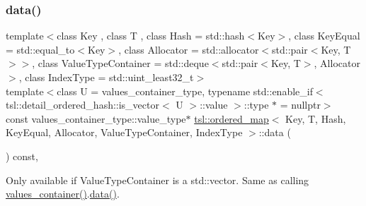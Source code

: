 \subsubsection{\texorpdfstring{data()}{data()}}
{\footnotesize\ttfamily template$<$class Key , class T , class Hash  = std\+::hash$<$\+Key$>$, class Key\+Equal  = std\+::equal\+\_\+to$<$\+Key$>$, class Allocator  = std\+::allocator$<$std\+::pair$<$\+Key, T$>$$>$, class Value\+Type\+Container  = std\+::deque$<$std\+::pair$<$\+Key, T$>$, Allocator$>$, class Index\+Type  = std\+::uint\+\_\+least32\+\_\+t$>$ \\
template$<$class U  = values\+\_\+container\+\_\+type, typename std\+::enable\+\_\+if$<$ tsl\+::detail\+\_\+ordered\+\_\+hash\+::is\+\_\+vector$<$ U $>$\+::value $>$\+::type $\ast$  = nullptr$>$ \\
const values\+\_\+container\+\_\+type\+::value\+\_\+type$\ast$ \mbox{\hyperlink{classtsl_1_1ordered__map}{tsl\+::ordered\+\_\+map}}$<$ Key, T, Hash, Key\+Equal, Allocator, Value\+Type\+Container, Index\+Type $>$\+::data (\begin{DoxyParamCaption}{ }\end{DoxyParamCaption}) const\hspace{0.3cm}{\ttfamily [inline]}, {\ttfamily [noexcept]}}

Only available if Value\+Type\+Container is a std\+::vector. Same as calling \textquotesingle{}\mbox{\hyperlink{classtsl_1_1ordered__map_abb69bca0a80def48ae806078d77175cb}{values\+\_\+container()}}.\mbox{\hyperlink{classtsl_1_1ordered__map_aad8598e2f2dfeed429cfe80a1884ba20}{data()}}\textquotesingle{}. \mbox{\label{classtsl_1_1ordered__map_a29bb8bff9283ad24501b9b3fbdeeb478}} 
